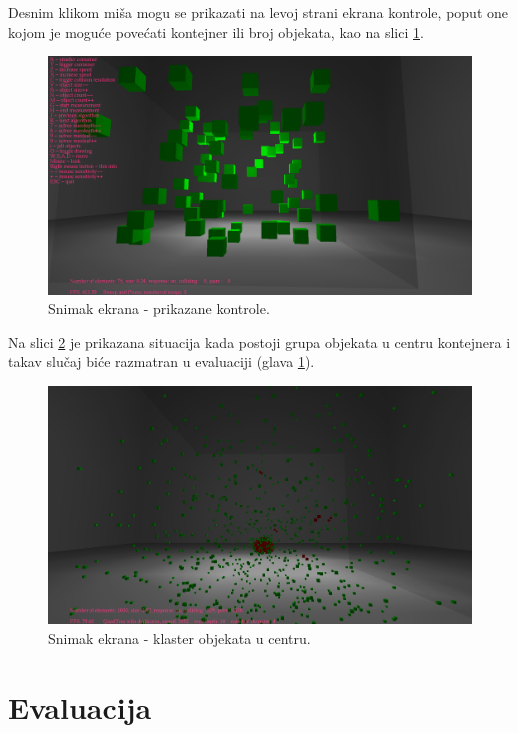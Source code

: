 \documentclass[12pt,oneside]{memoir}
\begin{document}
\noindent Desnim klikom miša mogu se prikazati 
na levoj strani ekrana kontrole,
poput one kojom je moguće povećati kontejner ili broj objekata, kao na slici \ref{fig:ssinfo}.

\begin{figure}[h!]
	\centerfloat
	\includegraphics[scale=0.3]{ssinfo.png}
	\caption{Snimak ekrana - prikazane kontrole.}
	\label{fig:ssinfo}
\end{figure}

\noindent Na slici \ref{fig:ssyank} je prikazana situacija kada postoji grupa objekata u centru kontejnera i takav slučaj biće 
razmatran u evaluaciji (glava \ref{sec:evaluacija}).

\begin{figure}[h!]
	\centerfloat
	\includegraphics[scale=0.3]{ssyank.jpg}
	\caption{Snimak ekrana - klaster objekata u centru.}
	\label{fig:ssyank}
\end{figure}

\chapter{Evaluacija}
\label{sec:evaluacija}
\end{document}
